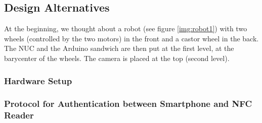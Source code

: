 \subsection{Design Alternatives}
At the beginning, we thought about a robot (see figure \ref{img:robot1}) with two wheels (controlled by the two motors) in the front and a castor wheel in the back. The NUC and the Arduino sandwich are then put at the first level, at the barycenter of the wheels. The camera is placed at the top (second level).

\subsubsection{Hardware Setup}

\subsubsection{Protocol for Authentication between Smartphone and NFC Reader}

